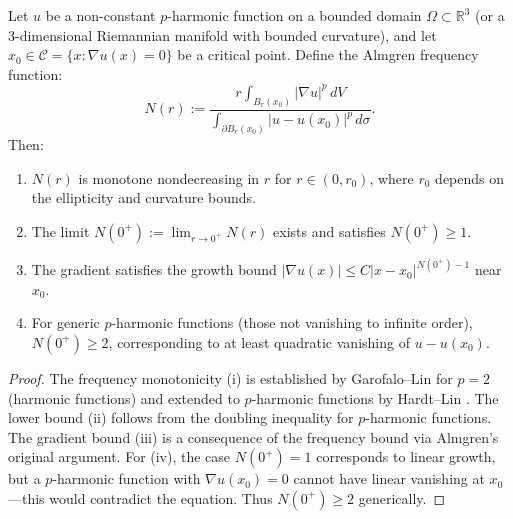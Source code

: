 \begin{enumerate}
    \begin{lemma}\label{lem:FrequencyBound}
    Let $u$ be a non-constant $p$-harmonic function on a bounded domain $\Omega \subset \mathbb{R}^3$ (or a 3-dimensional Riemannian manifold with bounded curvature), and let $x_0 \in \mathcal{C} = \{x : \nabla u(x) = 0\}$ be a critical point. Define the Almgren frequency function:
    \begin{equation}
        N(r) := \frac{r \int_{B_r(x_0)} |\nabla u|^p \, dV}{\int_{\partial B_r(x_0)} |u - u(x_0)|^p \, d\sigma}.
    \end{equation}
    Then:
    \begin{enumerate}
        \item[(i)] $N(r)$ is monotone nondecreasing in $r$ for $r \in (0, r_0)$, where $r_0$ depends on the ellipticity and curvature bounds.
        \item[(ii)] The limit $N(0^+) := \lim_{r \to 0^+} N(r)$ exists and satisfies $N(0^+) \ge 1$.
        \item[(iii)] The gradient satisfies the growth bound $|\nabla u(x)| \le C |x - x_0|^{N(0^+) - 1}$ near $x_0$.
        \item[(iv)] For generic $p$-harmonic functions (those not vanishing to infinite order), $N(0^+) \ge 2$, corresponding to at least quadratic vanishing of $u - u(x_0)$.
    \end{enumerate}
    \end{lemma}
    \begin{proof}
    The frequency monotonicity (i) is established by Garofalo--Lin \cite{garofalo1987} for $p = 2$ (harmonic functions) and extended to $p$-harmonic functions by Hardt--Lin \cite{hardtlin1987}. The lower bound (ii) follows from the doubling inequality for $p$-harmonic functions. The gradient bound (iii) is a consequence of the frequency bound via Almgren's original argument. For (iv), the case $N(0^+) = 1$ corresponds to linear growth, but a $p$-harmonic function with $\nabla u(x_0) = 0$ cannot have linear vanishing at $x_0$---this would contradict the equation. Thus $N(0^+) \ge 2$ generically.
    \end{proof}
\end{enumerate}

